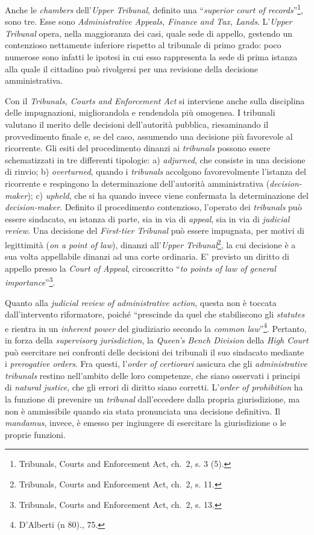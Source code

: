 \documentclass[12pt,it,a4paper,]{report}
\begin{document}
Anche le \emph{chambers} dell'\emph{Upper Tribunal}, definito una
``\emph{superior court of records}''\footnote{Tribunals, Courts and
  Enforcement Act, ch.~2, s. 3 (5).}, sono tre. Esse sono
\emph{Administrative Appeals, Finance and Tax, Lands}. L'\emph{Upper
Tribunal} opera, nella maggioranza dei casi, quale sede di appello,
gestendo un contenzioso nettamente inferiore rispetto al tribunale di
primo grado: poco numerose sono infatti le ipotesi in cui esso
rappresenta la sede di prima istanza alla quale il cittadino può
rivolgersi per una revisione della decisione amministrativa.

Con il \emph{Tribunals, Courts and Enforcement Act} si interviene anche
sulla disciplina delle impugnazioni, migliorandola e rendendola più
omogenea. I tribunali valutano il merito delle decisioni dell'autorità
pubblica, riesaminando il provvedimento finale e, se del caso, assumendo
una decisione più favorevole al ricorrente. Gli esiti del procedimento
dinanzi ai \emph{tribunals} possono essere schematizzati in tre
differenti tipologie: a) \emph{adjurned}, che consiste in una decisione
di rinvio; b) \emph{overturned}, quando i \emph{tribunals} accolgono
favorevolmente l'istanza del ricorrente e respingono la determinazione
dell'autorità amministrativa (\emph{decision-maker}); c) \emph{upheld},
che si ha quando invece viene confermata la determinazione del
\emph{decision-maker}. Definito il procedimento contenzioso, l'operato
dei \emph{tribunals} può essere sindacato, su istanza di parte, sia in
via di \emph{appeal}, sia in via di \emph{judicial review}. Una
decisione del \emph{First-tier Tribunal} può essere impugnata, per
motivi di legittimità (\emph{on a point of law}), dinanzi
all'\emph{Upper Tribunal}\footnote{Tribunals, Courts and Enforcement
  Act, ch.~2, s. 11.}, la cui decisione è a sua volta appellabile
dinanzi ad una corte ordinaria. E' previsto un diritto di appello presso
la \emph{Court of Appeal}, circoscritto ``\emph{to points of law of
general importance}''\footnote{Tribunals, Courts and Enforcement Act,
  ch.~2, s. 13.}.

Quanto alla \emph{judicial review of administrative action}, questa non
è toccata dall'intervento riformatore, poiché ``prescinde da quel che
stabiliscono gli \emph{statutes} e rientra in un \emph{inherent power}
del giudiziario secondo la \emph{common law}''\footnote{{D'Alberti (n
  80).}, 75.}. Pertanto, in forza della \emph{supervisory jurisdiction},
la \emph{Queen's Bench Division} della \emph{High Court} può esercitare
nei confronti delle decisioni dei tribunali il suo sindacato mediante i
\emph{prerogative orders}. Fra questi, l'\emph{order of certiorari}
assicura che gli \emph{administrative tribunals} restino nell'ambito
delle loro competenze, che siano osservati i principi di \emph{natural
justice}, che gli errori di diritto siano corretti. L'\emph{order of
prohibition} ha la funzione di prevenire un \emph{tribunal}
dall'eccedere dalla propria giurisdizione, ma non è ammissibile quando
sia stata pronunciata una decisione definitiva. Il \emph{mandamus},
invece, è emesso per ingiungere di esercitare la giurisdizione o le
proprie funzioni.
\end{document}
